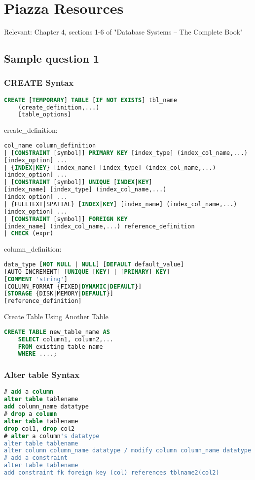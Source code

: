 \section{Piazza Resources}
Relevant: Chapter 4, sections 1-6 of "Database Systems -- The Complete Book"

\subsection*{Sample question 1}
\subsubsection*{CREATE Syntax}
\begin{lstlisting}[language=SQL]
CREATE [TEMPORARY] TABLE [IF NOT EXISTS] tbl_name
    (create_definition,...)
    [table_options]
\end{lstlisting}

create\_definition:

\begin{lstlisting}[language=SQL]
col_name column_definition
| [CONSTRAINT [symbol]] PRIMARY KEY [index_type] (index_col_name,...)
[index_option] ...
| {INDEX|KEY} [index_name] [index_type] (index_col_name,...)
[index_option] ...
| [CONSTRAINT [symbol]] UNIQUE [INDEX|KEY]
[index_name] [index_type] (index_col_name,...)
[index_option] ...
| {FULLTEXT|SPATIAL} [INDEX|KEY] [index_name] (index_col_name,...)
[index_option] ...
| [CONSTRAINT [symbol]] FOREIGN KEY
[index_name] (index_col_name,...) reference_definition
| CHECK (expr)
\end{lstlisting}

column\_definition:
\begin{lstlisting}[language=SQL]
data_type [NOT NULL | NULL] [DEFAULT default_value]
[AUTO_INCREMENT] [UNIQUE [KEY] | [PRIMARY] KEY]
[COMMENT 'string']
[COLUMN_FORMAT {FIXED|DYNAMIC|DEFAULT}]
[STORAGE {DISK|MEMORY|DEFAULT}]
[reference_definition]
\end{lstlisting}

Create Table Using Another Table
\begin{lstlisting}[language=SQL]
CREATE TABLE new_table_name AS
    SELECT column1, column2,...
    FROM existing_table_name
    WHERE ....;

\end{lstlisting}


\subsubsection*{Alter table Syntax}
\begin{lstlisting}[language=SQL]
# add a column
alter table tablename
add column_name datatype
# drop a column
alter table tablename
drop col1, drop col2
# alter a column's datatype
alter table tablename
alter column column_name datatype / modify column column_name datatype auto_increment
# add a constraint
alter table tablename
add constraint fk foreign key (col) references tblname2(col2)
\end{lstlisting}

